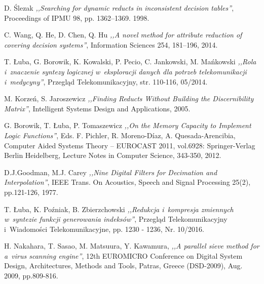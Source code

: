 \begin{thebibliography}{99}
 D. Ślezak \emph{,,Searching for dynamic reducts in inconsistent decision tables''}, Proceedings of IPMU 98, pp. 1362–1369. 1998.

 C. Wang, Q. He, D. Chen, Q. Hu \emph{,,A novel method for attribute reduction of covering decision systems''}, Information Sciences 254, 181–196, 2014.

 T. Łuba, G. Borowik, K. Kowalski, P. Pecio, C. Jankowski, M. Mańkowski \emph{,,Rola i~znaczenie syntezy logicznej w~eksploracji danych dla potrzeb telekomunikacji i~medycyny''}, Przegląd Telekomunikacyjny, str. 110-116, 05/2014.

 M. Korzeń, S. Jaroszewicz \emph{,,Finding Reducts Without Building the Discernibility Matrix''}, Intelligent Systems Design and Applications, 2005.

 G. Borowik, T. Łuba, P. Tomaszewicz \emph{,,On the Memory Capacity to Implement Logic Functions''}, Eds. F. Pichler, R. Moreno-Díaz, A. Quesada-Arencibia, Computer Aided Systems Theory – EUROCAST 2011, vol.6928: Springer-Verlag Berlin Heidelberg, Lecture Notes in Computer Science, 343-350, 2012.

 D.J.Goodman, M.J. Carey \emph{,,Nine Digital Filters for Decimation and Interpolation''}, IEEE Trans. On Acoustics, Speech and Signal Processing 25(2), pp.121-126, 1977.

 T. Łuba, K. Poźniak, B. Zbierzchowski \emph{,,Redukcja i~kompresja zmiennych w~syntezie funkcji generowania indeksów''}, Przegląd Telekomunikacyjny i~Wiadomości Telekomunikacyjne, pp. 1230 - 1236, Nr. 10/2016.

 H. Nakahara, T. Sasao, M. Matsuura, Y. Kawamura, \emph{,,A parallel sieve method for a~virus scanning engine''}, 12th EUROMICRO Conference on Digital System Design, Architectures, Methods and Tools, Patras, Greece (DSD-2009), Aug. 2009, pp.809-816.

\end{thebibliography}
\clearpage




